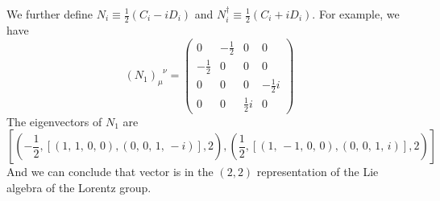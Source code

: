 \documentclass[cyan]{elegantnote}
\begin{document}
We further define $N_i \equiv \frac{1}{2}(C_i-iD_i)$ and $N^{\dagger}_i \equiv \frac{1}{2}(C_i + i D_i)$. For example, we have
\[(N_1)_{\mu}^{\phantom{\mu}\nu} = \left(\begin{array}{rrrr}
0 & -\frac{1}{2} & 0 & 0 \\
-\frac{1}{2} & 0 & 0 & 0 \\
0 & 0 & 0 & -\frac{1}{2} i \\
0 & 0 & \frac{1}{2} i & 0
\end{array}\right)\]
The eigenvectors of $N_1$ are
\[\left[\left(-\frac{1}{2}, \left[\left(1,\,1,\,0,\,0\right),
\left(0,\,0,\,1,\,-i\right)\right], 2\right), \left(\frac{1}{2},
\left[\left(1,\,-1,\,0,\,0\right), \left(0,\,0,\,1,\,i\right)\right],
2\right)\right]\]
And we can conclude that vector is in the $(2,2)$ representation of the Lie algebra of the Lorentz group.
\end{document}
